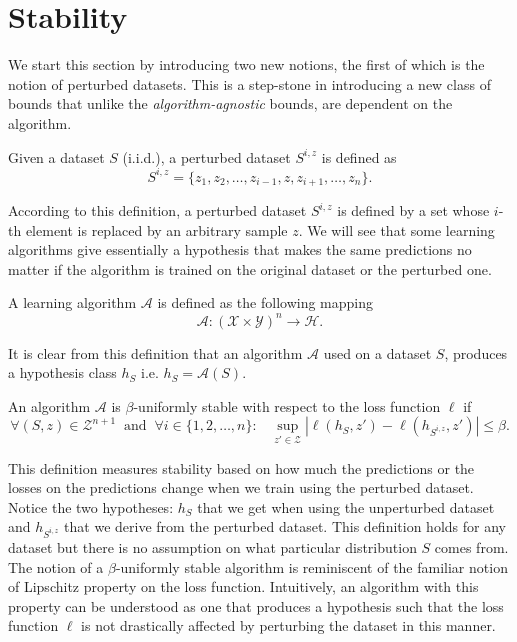 \documentclass{article}
\begin{document}
\section{Stability}
We start this section by introducing two new notions, the first of which is the notion of  perturbed datasets. This is a step-stone in introducing a new class of bounds that unlike the   \textit{algorithm-agnostic} bounds, are dependent on the algorithm. 
\begin{defn} Given a dataset $S$ (i.i.d.), a perturbed dataset $S^{i, z}$ is defined as
\[
	S^{i,z} = \{z_1, z_2, \dots, z_{i-1}, z, z_{i+1}, \dots, z_{n} \}.
\]
\end{defn}
According to this definition, a perturbed dataset $S^{i,z}$ is defined by a set whose $i$-th element is replaced by an arbitrary sample $z$. 
We will see that some learning algorithms give essentially a hypothesis that makes the same predictions no matter if the algorithm is trained on the original dataset or the perturbed one.
\begin{defn}[Algorithm]
A learning algorithm $\mathcal{A}$ is defined as the following mapping
\[
\mathcal{A}: (\mathcal{X} \times \mathcal{Y})^n \rightarrow \mathcal{H}.
\]
\end{defn}
It is clear from this definition that an algorithm $\mathcal{A}$ used on a dataset $S$, produces a hypothesis class $h_{S}$ i.e. $h_S = \mathcal{A}(S)$.


\begin{defn} An algorithm $\mathcal{A}$ is $\beta$-uniformly stable with respect to the loss function $\ell$ if
\[\forall (S,z) \in \mathcal{Z}^{n+1}\;\; \text{and} \;\;\forall i \in \{1, 2, \dots, n\}:\;\;\;
	\sup_{z' \in \mathcal{Z}} | \ell(h_S,z') - \ell(h_{S^{i, z}},z' ) | \le \beta.
\]
\end{defn}
This definition measures stability based on how much the predictions or the losses on the predictions change when we train using the perturbed dataset. Notice the two hypotheses: $h_S$ that we get when using the unperturbed dataset and $h_{S^{i,z}}$ that we derive from the perturbed dataset. This definition holds for any dataset but there is no assumption on what particular distribution $S$ comes from. The notion of a $\beta$-uniformly stable algorithm is reminiscent of the familiar notion of Lipschitz property on the loss function. Intuitively, an algorithm with this property can be understood as one that produces a hypothesis such that the loss function $\ell$ is not drastically affected by perturbing the dataset in this manner.\\ 
 
\end{document}
